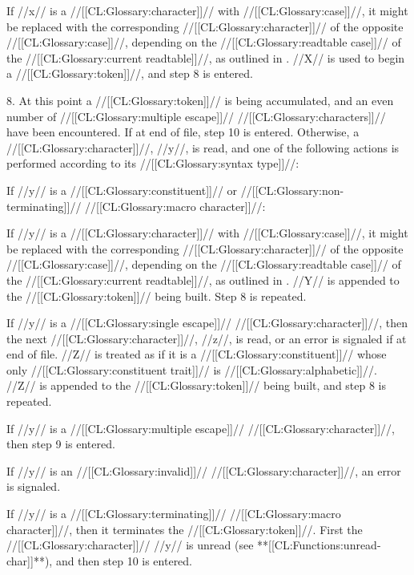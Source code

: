 If //x// is a //[[CL:Glossary:character]]// with //[[CL:Glossary:case]]//, it might be replaced with the corresponding //[[CL:Glossary:character]]// of the opposite //[[CL:Glossary:case]]//,  depending on the //[[CL:Glossary:readtable case]]// of the //[[CL:Glossary:current readtable]]//, as outlined in \secref\ReadtableCaseReadEffect. //X// is used to begin a //[[CL:Glossary:token]]//, and step 8 is entered.

\item{8.} At this point a //[[CL:Glossary:token]]// is being accumulated, and an even number of //[[CL:Glossary:multiple escape]]// //[[CL:Glossary:characters]]// have been encountered. If at end of file, step 10 is entered. Otherwise, a //[[CL:Glossary:character]]//, //y//, is read, and one of the following actions is performed according to its //[[CL:Glossary:syntax type]]//:

\beginlist \itemitem{\bull} If //y// is a //[[CL:Glossary:constituent]]// or //[[CL:Glossary:non-terminating]]// //[[CL:Glossary:macro character]]//: \beginlist \itemitem{--}

If //y// is a //[[CL:Glossary:character]]// with //[[CL:Glossary:case]]//, it might be replaced with the corresponding //[[CL:Glossary:character]]// of the opposite //[[CL:Glossary:case]]//,  depending on the //[[CL:Glossary:readtable case]]// of the //[[CL:Glossary:current readtable]]//, as outlined in \secref\ReadtableCaseReadEffect. \itemitem{--} //Y// is appended to the //[[CL:Glossary:token]]// being built. \itemitem{--} Step 8 is repeated. \endlist

\itemitem{\bull} If //y// is a //[[CL:Glossary:single escape]]// //[[CL:Glossary:character]]//, then the next //[[CL:Glossary:character]]//, //z//, is read, or an error  is signaled if at end of file. //Z// is treated as if it is a //[[CL:Glossary:constituent]]//  whose only //[[CL:Glossary:constituent trait]]// is //[[CL:Glossary:alphabetic]]//. //Z// is appended to the //[[CL:Glossary:token]]// being built, and step 8 is repeated.

\itemitem{\bull} If //y// is a //[[CL:Glossary:multiple escape]]// //[[CL:Glossary:character]]//, then step 9 is entered.

\itemitem{\bull} If //y// is an //[[CL:Glossary:invalid]]// //[[CL:Glossary:character]]//, an error  is signaled.

\itemitem{\bull} If //y// is a //[[CL:Glossary:terminating]]// //[[CL:Glossary:macro character]]//, then it terminates the //[[CL:Glossary:token]]//. First the //[[CL:Glossary:character]]// //y// is unread (see **[[CL:Functions:unread-char]]**), and then step 10 is entered.

